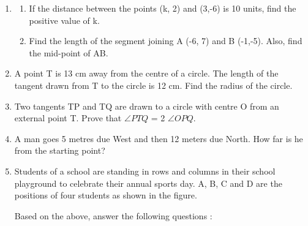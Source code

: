 \documentclass{article}
\begin{document}
\begin{enumerate}
		\item 
		\begin{enumerate}
			\item  If the distance between the points (k, 2) and (3,-6) is 10 units, find the positive value of k. 
			
			\item  Find the length of the segment joining A (-6, 7) and B (-1,-5). Also, find the mid-point of AB. 
		\end{enumerate}
		

		\item  A point T is 13 cm away from the centre of a circle. The length of the tangent drawn from T to the circle is 12 cm. Find the radius of the circle. 
		
		\item  Two tangents TP and TQ are drawn to a circle with centre O from an external point T. Prove that $\angle PTQ$ = 2 $\angle OPQ$. 

		\item  A man goes 5 metres due West and then 12 meters due North. How far is he from the starting point?
		
		\item Students of a school are standing in rows and columns in their school playground to celebrate their annual sports day. A, B, C and D are the positions of four students as shown in the figure.
		\begin{center}
		\end{center}
		Based on the above, answer the following questions : 
		

\end{enumerate}
\end{document}
